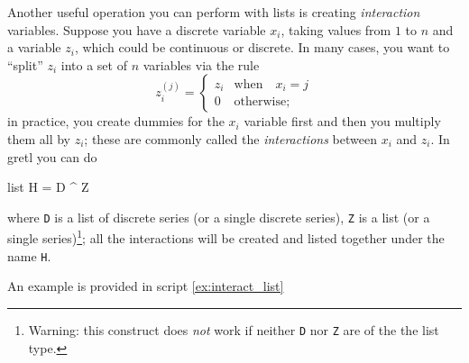 Another useful operation you can perform with lists is creating
\emph{interaction} variables. Suppose you have a discrete variable
$x_i$, taking values from $1$ to $n$ and a variable $z_i$, which could
be continuous or discrete. In many cases, you want to ``split'' $z_i$
into a set of $n$ variables via the rule
\[
z^{(j)}_i =\left\{ 
    \begin{array}{ll}
      z_i & \mathrm{when} \quad x_i = j \\
      0 & \mathrm{otherwise;}
    \end{array}
    \right. 
\] 
in practice, you create dummies for the $x_i$ variable first and then
you multiply them all by $z_i$; these are commonly called the
\emph{interactions} between $x_i$ and $z_i$. In gretl you can do 
\begin{code}
  list H = D ^ Z
\end{code}
where \texttt{D} is a list of discrete series (or a single discrete
series), \texttt{Z} is a list (or a single series)\footnote{Warning:
  this construct does \emph{not} work if neither \texttt{D} nor
  \texttt{Z} are of the the list type.}; all the interactions will be
created and listed together under the name \texttt{H}.

An example is provided in script \ref{ex:interact_list}

